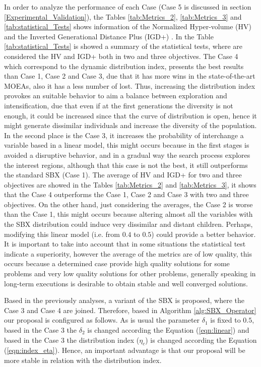In order to analyze the performance of each Case (Case 5 is discussed in section \ref{Experimental_Validation}), the Tables \ref{tab:Metrics_2}, \ref{tab:Metrics_3} and \ref{tab:statistical_Tests} shows information of the Normalized Hyper-volume (HV) \cite{zitzler1999multiobjective} and the Inverted Generational Distance Plus (IGD+) \cite{Joel:IGDPlus_And_GDPlus}.
%
In the Table \ref{tab:statistical_Tests} is showed a summary of the statistical tests, where are considered the HV and IGD+ both in two and three objectives.
%
The Case 4 which correspond to the dynamic distribution index, presents the best results than Case 1, Case 2 and Case 3, due that it has more wins in the state-of-the-art MOEAs, also it has a less number of lost.
%
Thus, increasing the distribution index provokes an suitable behavior to aim a balance between exploration and intensification, due that even if at the first generations the diversity is not enough, it could be increased since that the curve of distribution is open, hence it might generate dissimilar individuals and increase the diversity of the population.
%
In the second place is the Case 3, it increases the probability of interchange a variable based in a linear model, this might occurs because in the first stages is avoided a disruptive behavior, and in a gradual way the search process explores the interest regions, although that this case is not the best, it still outperforms the standard SBX (Case 1).
%
%
The average of HV and IGD+ for two and three objectives are showed in the Tables \ref{tab:Metrics_2} and \ref{tab:Metrics_3}, it shows that the Case 4 outperforms the Case 1, Case 2 and Case 3 with two and three objectives.
%
On the other hand, just considering the averages, the Case 2 is worse than the Case 1, this might occurs because altering almost all the variables with the SBX distribution could induce very dissimilar and distant children.
%
Perhaps, modifying this linear model (i.e. from $0.4$ to $0.5$) could provide a better behavior.
%
It is important to take into account that in some situations the statistical test indicate a superiority, however the average of the metrics are of low quality, this occurs because a determined case provide high quality solutions for some problems and very low quality solutions for other problems, generally speaking in long-term executions is desirable to obtain stable and well converged solutions.
%

Based in the previously analyses, a variant of the SBX is proposed, where the Case 3 and Case 4 are joined.
%
Therefore, based in Algorithm \ref{alg:SBX_Operator} our proposal is configured as follows.
%
As is usual the parameter $\delta_1$ is fixed to $0.5$, based in the Case 3 the $\delta_2$ is changed according the Equation (\ref{eqn:linear}) and based in the Case 3 the distribution index ($\eta_c$) is changed according the Equation (\ref{eqn:index_eta}).
%
Hence, an important advantage is that our proposal will be more stable in relation with the distribution index.





